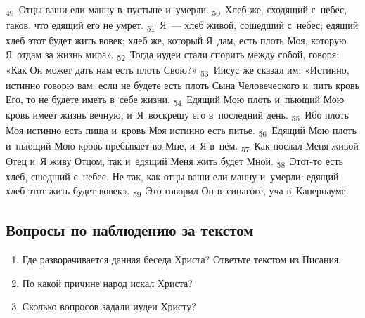 \documentclass[a4paper,12pt]{article}
\begin{document}
\textsubscript{49}~Отцы ваши ели манну в~пустыне и~умерли.
\textsubscript{50}~Хлеб же, сходящий с~небес, таков, что едящий его не умрет.
\textsubscript{51}~Я~--- хлеб живой, сошедший с~небес; едящий хлеб этот будет жить вовек; хлеб же, который Я~дам, есть плоть Моя, которую Я~отдам за жизнь мира».
\textsubscript{52}~Тогда иудеи стали спорить между собой, говоря: «Как Он может дать нам есть плоть Свою?»
\textsubscript{53}~Иисус же сказал им: «Истинно, истинно говорю вам: если не будете есть плоть Сына Человеческого и~пить кровь Его, то не будете иметь в~себе жизни.
\textsubscript{54}~Едящий Мою плоть и~пьющий Мою кровь имеет жизнь вечную, и~Я~воскрешу его в~последний день.
\textsubscript{55}~Ибо плоть Моя истинно есть пища и~кровь Моя истинно есть питье.
\textsubscript{56}~Едящий Мою плоть и~пьющий Мою кровь пребывает во Мне, и~Я в~нём.
\textsubscript{57}~Как послал Меня живой Отец и~Я живу Отцом, так и~едящий Меня жить будет Мной.
\textsubscript{58}~Этот-то есть хлеб, сшедший с~небес. Не так, как отцы ваши ели манну и~умерли; едящий хлеб этот жить будет вовек».
\textsubscript{59}~Это говорил Он в~синагоге, уча в~Капернауме. 

\subsection*{Вопросы по наблюдению за текстом}
\begin{enumerate}
    \item Где разворачивается данная беседа Христа? Ответьте текстом из Писания. 
    
    \myline
    
    \myline
    \item По какой причине народ искал Христа? 
    
    \myline
    
    \myline
    \item Сколько вопросов задали иудеи Христу? 
    
    \myline
    
    \myline
\end{enumerate}
\end{document}
